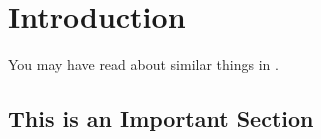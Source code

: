 \chapter{Introduction}\label{ch:intro}

You may have read about similar things in \cite{Goodliffe2007}.
\blindtext

\blindtext

\section{This is an Important Section}
\blindtext

\blindtext
